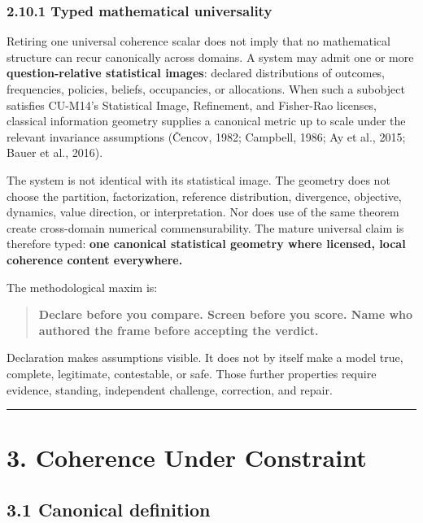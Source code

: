 \documentclass[
  11pt,
]{article}
\begin{document}
\subsubsection{2.10.1 Typed mathematical
universality}\label{typed-mathematical-universality}

Retiring one universal coherence scalar does not imply that no
mathematical structure can recur canonically across domains. A system
may admit one or more \textbf{question-relative statistical images}:
declared distributions of outcomes, frequencies, policies, beliefs,
occupancies, or allocations. When such a subobject satisfies CU-M14's
Statistical Image, Refinement, and Fisher-Rao licenses, classical
information geometry supplies a canonical metric up to scale under the
relevant invariance assumptions (Čencov, 1982; Campbell, 1986; Ay et
al., 2015; Bauer et al., 2016).

The system is not identical with its statistical image. The geometry
does not choose the partition, factorization, reference distribution,
divergence, objective, dynamics, value direction, or interpretation. Nor
does use of the same theorem create cross-domain numerical
commensurability. The mature universal claim is therefore typed:
\textbf{one canonical statistical geometry where licensed, local
coherence content everywhere.}

The methodological maxim is:

\begin{quote}
\textbf{Declare before you compare. Screen before you score. Name who
authored the frame before accepting the verdict.}
\end{quote}

Declaration makes assumptions visible. It does not by itself make a
model true, complete, legitimate, contestable, or safe. Those further
properties require evidence, standing, independent challenge,
correction, and repair.

\begin{center}\rule{0.5\linewidth}{0.5pt}\end{center}

\section{3. Coherence Under
Constraint}\label{coherence-under-constraint-1}

\subsection{3.1 Canonical definition}\label{canonical-definition}
\end{document}
